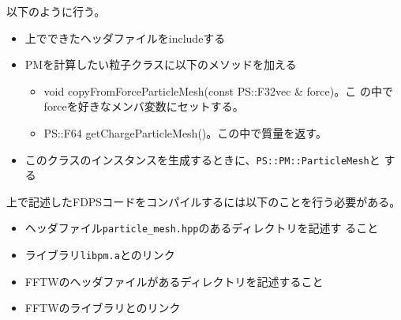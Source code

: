 
以下のように行う。
\begin{itemize}
\item 上でできたヘッダファイルをincludeする
\item PMを計算したい粒子クラスに以下のメソッドを加える
     \begin{itemize}
     \item void copyFromForceParticleMesh(const PS::F32vec \& force)。こ
     の中でforceを好きなメンバ変数にセットする。
     \item PS::F64 getChargeParticleMesh()。この中で質量を返す。
     \end{itemize}
\item このクラスのインスタンスを生成するときに、{\tt PS::PM::ParticleMesh}と
する
\end{itemize}


上で記述したFDPSコードをコンパイルするには以下のことを行う必要がある。
\begin{itemize}
\item ヘッダファイル{\tt particle\_mesh.hpp}のあるディレクトリを記述す
  ること
\item ライブラリ{\tt libpm.a}とのリンク
\item FFTWのヘッダファイルがあるディレクトリを記述すること
\item FFTWのライブラリとのリンク
\end{itemize}
